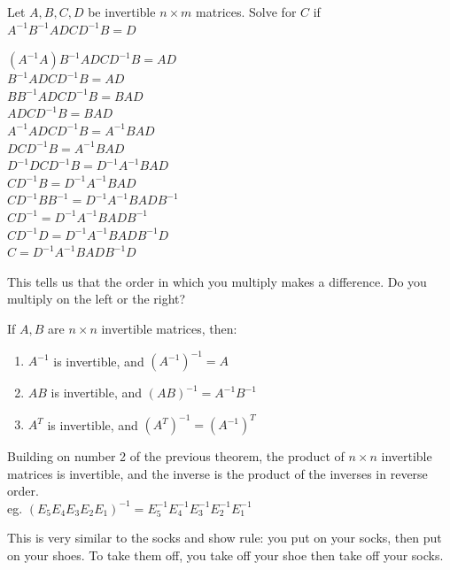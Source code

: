 \documentclass{report}
\begin{document}
\begin{example}
Let $A, B, C, D$ be invertible $n\times m$ matrices. Solve for $C$ if \\$A^{-1}B^{-1}ADCD^{-1}B=D$
\begin{center}
	$(A^{-1}A)B^{-1}ADCD^{-1}B=AD$\\
	$B^{-1}ADCD^{-1}B=AD$\\
	$BB^{-1}ADCD^{-1}B=BAD$\\
	$ADCD^{-1}B=BAD$\\
	$A^{-1}ADCD^{-1}B=A^{-1}BAD$\\
	$DCD^{-1}B=A^{-1}BAD$\\
	$D^{-1}DCD^{-1}B=D^{-1}A^{-1}BAD$\\
	$CD^{-1}B=D^{-1}A^{-1}BAD$\\
	$CD^{-1}BB^{-1}=D^{-1}A^{-1}BADB^{-1}$\\
	$CD^{-1}=D^{-1}A^{-1}BADB^{-1}$\\
	$CD^{-1}D=D^{-1}A^{-1}BADB^{-1}D$\\
	$C=D^{-1}A^{-1}BADB^{-1}D$\\	
\end{center}
\end{example}

This tells us that the order in which you multiply makes a difference. Do you multiply on the left or the right?

\begin{theorem}
If $A, B$ are $n\times n$ invertible matrices, then:
\begin{enumerate}
	\item $A^{-1}$ is invertible, and $(A^{-1})^{-1}=A$
	\item $AB$ is invertible, and $(AB)^{-1}=A^{-1}B^{-1}$
	\item $A^{T}$ is invertible, and $(A^{T})^{-1}=(A^{-1})^T$
\end{enumerate}
\end{theorem}

\begin{theorem}
Building on number 2 of the previous theorem, the product of $n\times n$ invertible matrices is invertible, and the inverse is the product of the inverses in reverse order.\\
\bigskip
eg. $(E_5E_4E_3E_2E_1)^{-1}=E_5^{-1}E_4^{-1}E_3^{-1}E_2^{-1}E_1^{-1}$
\end{theorem}

This is very similar to the socks and show rule: you put on your socks, then put on your shoes. To take them off, you take off your shoe then take off your socks.
\end{document}

